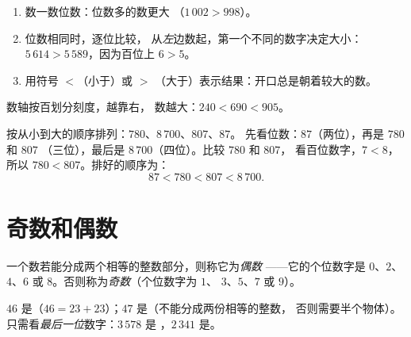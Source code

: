 \begin{method}[比较两个数]\label{met:g3:numbers:compare}
\begin{enumerate}
  \item 数一数位数：位数多的数更大
        （$1\,002 > 998$）。
  \item 位数相同时，逐位比较，
        从\emph{左}边数起，第一个不同的数字决定大小：
        $5\,614 > 5\,589$，因为百位上 $6 > 5$。
  \item 用符号 $<$（小于）或 $>$
        （大于）表示结果：开口总是朝着较大的数。
\end{enumerate}
\end{method}

\begin{omfigure}

{\small 数轴按百划分刻度，越靠右，
数越大：$240 < 690 < 905$。}
\end{omfigure}

\begin{example}\label{ex:g3:numbers:order}
按从小到大的顺序排列：$780$、$8\,700$、$807$、$87$。
先看位数：$87$（两位），再是 $780$ 和 $807$
（三位），最后是 $8\,700$（四位）。比较 $780$ 和 $807$，
看百位数字，$7 < 8$，所以 $780 < 807$。排好的顺序为：
\[
87 < 780 < 807 < 8\,700 .
\]
\end{example}

\section{奇数和偶数}

\begin{definition}[偶数、奇数]\label{def:g3:numbers:evenodd}
一个数若能分成两个相等的整数部分，则称它为\emph{偶数}
——它的个位数字是 $0$、$2$、$4$、$6$ 或
$8$。否则称为\emph{奇数}（个位数字为 $1$、
$3$、$5$、$7$ 或 $9$）。
\end{definition}

\begin{example}
$46$ 是（$46 = 23 + 23$）；$47$ 是（不能分成两份相等的整数，
否则需要半个物体）。只需看\emph{最后一位}数字：$3\,578$ 是
，$2\,341$ 是。
\end{example}

